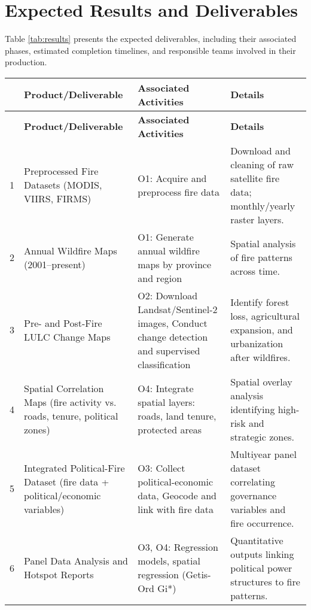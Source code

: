 \section{Expected Results and Deliverables}

Table \ref{tab:results} presents the expected deliverables, including their associated phases, estimated completion timelines, and responsible teams involved in their production.

\begin{table}
    \begin{longtable}{@{} p{0.2cm} p{5cm} p{5cm} p{5cm} @{}}
    \toprule
     & \textbf{Product/Deliverable} & \textbf{Associated Activities} & \textbf{Details} \\
    \midrule
    \endfirsthead
    \toprule
     & \textbf{Product/Deliverable} & \textbf{Associated Activities} & \textbf{Details} \\
    \midrule
    \endhead
        1 & Preprocessed Fire Datasets (MODIS, VIIRS, FIRMS) & O1: Acquire and preprocess fire data & Download and cleaning of raw satellite fire data; monthly/yearly raster layers. \\
        
        2 & Annual Wildfire Maps (2001--present) & O1: Generate annual wildfire maps by province and region & Spatial analysis of fire patterns across time. \\
        
        3 & Pre- and Post-Fire LULC Change Maps & O2: Download Landsat/Sentinel-2 images, Conduct change detection and supervised classification & Identify forest loss, agricultural expansion, and urbanization after wildfires. \\
        
        4 & Spatial Correlation Maps (fire activity vs. roads, tenure, political zones) & O4: Integrate spatial layers: roads, land tenure, protected areas & Spatial overlay analysis identifying high-risk and strategic zones. \\
        
        5 & Integrated Political-Fire Dataset (fire data + political/economic variables) & O3: Collect political-economic data, Geocode and link with fire data & Multiyear panel dataset correlating governance variables and fire occurrence. \\
        
        6 & Panel Data Analysis and Hotspot Reports & O3, O4: Regression models, spatial regression (Getis-Ord Gi*) & Quantitative outputs linking political power structures to fire patterns. \\
        

\end{longtable}
\end{table}

